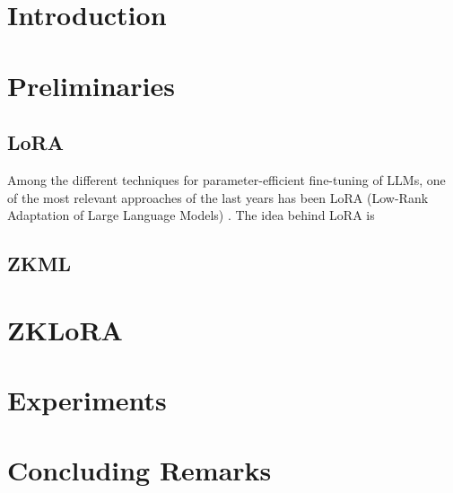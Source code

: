 \documentclass{article}
\begin{document}
\section{Introduction}



\section{Preliminaries}


\subsection{LoRA}
Among the different techniques for parameter-efficient fine-tuning of LLMs, one of the most relevant approaches of the last years has been LoRA (Low-Rank Adaptation of Large Language Models) \cite{hu2022lora}. The idea behind LoRA is 

\subsection{ZKML}




\section{ZKLoRA}

\section{Experiments}



\section{Concluding Remarks}




\end{document}

